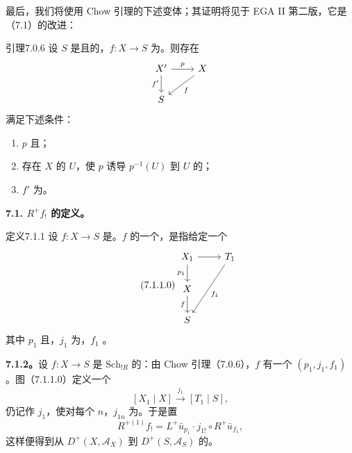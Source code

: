 最后，我们将使用 Chow 引理的下述变体；其证明将见于 EGA II 第二版，它是（7.1）的改进：
\begin{SGAresult}{引理}{7.0.6}
设 $S$ 是且的，$f:X\to S$ 为。则存在
\[
\begin{tikzcd}
X'\arrow[r,"p"]\arrow[d,"f'"']&X\arrow[dl,"f"]\\
S&
\end{tikzcd}
\]
满足下述条件：
\begin{enumerate}
\item[(i)] $p$ 且；
\item[(ii)] 存在 $X$ 的 $U$，使 $p$ 诱导 $p^{-1}(U)$ 到 $U$ 的；
\item[(iii)] $f'$ 为。
\end{enumerate}
\end{SGAresult}

\textbf{7.1. $R^+f_!$ 的定义。}
\begin{SGAresult}{定义}{7.1.1}
设 $f:X\to S$ 是。$f$ 的一个，是指给定一个
\begin{equation}\tag{7.1.1.0}
\begin{tikzcd}
X_1\arrow[r]\arrow[d,"p_1"']&T_1\arrow[ddl,"f_1"]\\
X\arrow[d,"f"']&\\
S&
\end{tikzcd}
\end{equation}
其中 $p_1$ 且，$j_1$ 为，$f_1$ 。
\end{SGAresult}

\textbf{7.1.2。}设 $f:X\to S$ 是 $\mathrm{Sch}_{!R}$ 的：由 Chow 引理（7.0.6），$f$ 有一个 $(p_1,j_1,f_1)$。图（7.1.1.0）定义一个
\[[X_1\mid X]\xrightarrow{j_1}[T_1\mid S],\]
仍记作 $j_1$，使对每个 $n$，$j_{1n}$ 为。于是置
\[R^{+(1)}f_!=L^+\bar u_{p_1}\cdot j_{1!}\circ R^+\bar u_{f_1},\]
这样便得到从 $D^+(X,\mathscr A_X)$ 到 $D^+(S,\mathscr A_S)$ 的。

